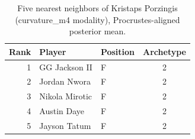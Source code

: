 \begin{table}[htbp]
  \centering\small
  \begin{tabular}{rllc}
    \toprule
    Rank & Player & Position & Archetype \\
    \midrule
    1 & GG Jackson II & F & 2 \\
    2 & Jordan Nwora & F & 2 \\
    3 & Nikola Mirotic & F & 2 \\
    4 & Austin Daye & F & 2 \\
    5 & Jayson Tatum & F & 2 \\
    \bottomrule
  \end{tabular}
  \caption{Five nearest neighbors of Kristaps Porzingis (curvature_m4 modality), Procrustes-aligned posterior mean.}
  \label{tab:Kristaps_Porzingis_neighbors_curvature_m4}
\end{table}


